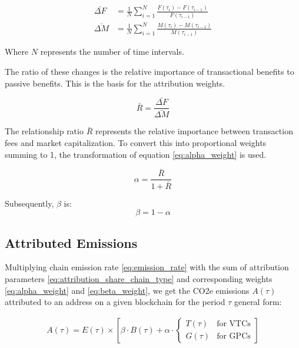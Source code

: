 \documentclass[11pt]{report}
\begin{document}
\begin{align}
    \bar{\Delta F} & = \frac{1}{N}\sum_{i=1}^{N}\frac{F(\tau_i) - F(\tau_{i-1})}{F(\tau_{i-1})} \\
    \bar{\Delta M} & = \frac{1}{N}\sum_{i=1}^{N}\frac{M(\tau_i) - M(\tau_{i-1})}{M(\tau_{i-1})}
\end{align}



Where \( N \) represents the number of time intervals.

The ratio of these changes is the relative importance of transactional benefits to passive benefits. This is the basis for the attribution weights.

\begin{equation} \label{eq:weights_ratio}
    \bar{R} = \frac{\bar{\Delta F}}{\bar{\Delta M}}
\end{equation}

The relationship ratio $\bar{R}$ represents the relative importance between transaction fees and market capitalization. To convert this into proportional weights summing to 1, the transformation of equation \eqref{eq:alpha_weight} is used.

\begin{equation} \label{eq:alpha_weight}
    \alpha = \frac{\bar{R}}{1 + \bar{R}}
\end{equation}

Subsequently, \( \beta \) is:
\begin{equation} \label{eq:beta_weight}
    \beta = 1 - \alpha
\end{equation}


\subsection{Attributed Emissions}

Multiplying chain emission rate \eqref{eq:emission_rate} with the sum of attribution parameters \eqref{eq:attribution_share_chain_type} and corresponding weights \eqref{eq:alpha_weight} and \eqref{eq:beta_weight}, we get the CO2e emissions \(A(\tau)\) attributed to an address on a given blockchain for the period $\tau$ general form:


\begin{align}
    A(\tau) = E(\tau) \times \left[\beta \cdot B(\tau) + \alpha \cdot \begin{cases}
                                                                              T(\tau) & \text{for VTCs} \\
                                                                              G(\tau) & \text{for GPCs}
                                                                          \end{cases}\right]
\end{align}
\end{document}
